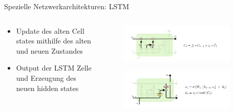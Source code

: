 \documentclass[aspectratio=1610, xcolor=dvipsnames, 9pt]{beamer}
\begin{document}
      \begin{frame}{Spezielle Netzwerkarchitekturen: LSTM}
        \begin{columns}
          \begin{column}{0.6\textwidth}
            \begin{itemize}
             
              \item Update des alten Cell states mithilfe des alten und neuen Zustandes \newline 
              \item Output der LSTM Zelle und Erzeugung des neuen hidden states \newline 
            \end{itemize}
          \end{column}
           \begin{column}{0.4\textwidth}
            
               \begin{figure}
                \centering
                            \includegraphics[width=0.9\textwidth]{images/LSTM_5.png}
                \end{figure}
                \begin{figure}
                  \centering
                              \includegraphics[width=0.9\textwidth]{images/LSTM_6.png}
                  \end{figure}

           \end{column}
        \end{columns}
      \end{frame} 
\end{document}
